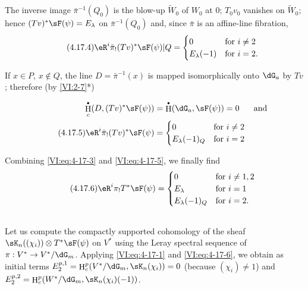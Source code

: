 \documentclass[oneside]{book}
\DeclareMathOperator{\h}{H}
\theoremstyle{sga-source}
\theoremstyle{sga-source-dash}
\theoremstyle{sga-source-dotdash}
\theoremstyle{sga-source-number-note-dash}
\theoremstyle{sga-source-note-number-dotdash}
\theoremstyle{sga-source-example-dotdash}
\theoremstyle{sga-source-inline-number}
\theoremstyle{sga-source-bare-number}
\theoremstyle{sga-source}
\let\oldbullet\bullet
\renewcommand{\bullet}{\textnormal{\tiny$\oldbullet$}}
\newcommand{\PrintPage}[1]{}\newcommand{\MathPage}[1]{}\newcommand{\PrintCite}[2]{#1}\newcommand{\var}[3]{#2}
\begin{document}
The inverse image $\bar\pi^{-1}(Q_0)$ is the blow-up $\widetilde W_0$ of 
$W_0$ at $0$; \var{$T_0 V_0$ vanishes}{$T_0 v_0$ vanishes}{S45-SOL-0849} on $\widetilde W_0$; hence 
$(T v)^\ast \sF(\psi)=E_\lambda$ \var{on $\pi^{-1}(Q_0)$}{on $\bar\pi^{-1}(Q_0)$}{S45-SOL-0850} and, since $\bar\pi$ is an 
affine-line fibration, 
\begin{equation*}\tag{4.17.4}\label{VI:eq:4-17-4}
  \eR^i \bar\pi_! (T v)^\ast \sF(\psi)|Q = 
    \begin{cases}
      0 & \text{for $i\ne 2$} \\
      E_\lambda(-1) & \text{for $i=2$.} 
    \end{cases} 
\end{equation*}

If $x\in P$, $x\notin Q$, the line \var{$D=\pi^{-1}(x)$}{$D=\bar\pi^{-1}(x)$}{S45-SOL-0851} is mapped 
isomorphically onto $\dG_a$ by $T v$; therefore (by 
\ref{VI:2-7}*) 
\PrintPage{206}
\begin{align} \notag 
  \h_c^\bullet(D,(T v)^\ast \sF(\psi)) &= \h^\bullet(\dG_a,\sF(\psi)) = 0 && \text{and} \\
  \tag{4.17.5}\label{VI:eq:4-17-5}
  \eR^i \bar\pi_! (T v)^\ast \sF(\psi) 
    &= \begin{cases} 
         0 & \text{for $i\ne 2$} \\
         E_\lambda(-1)_Q & \text{for $i=2$} 
       \end{cases} 
\end{align}

Combining \eqref{VI:eq:4-17-3} and \eqref{VI:eq:4-17-5}, we finally find 
\begin{equation*}\tag{4.17.6}\label{VI:eq:4-17-6}
  \eR^i \pi_! T^\ast\sF(\psi) = 
    \begin{cases}
      0 & \text{for $i\ne 1,2$} \\
      E_\lambda & \text{for $i=1$} \\
      E_\lambda(-1)_Q & \text{for $i=2$.} 
    \end{cases}
\end{equation*}





\subsection{}\label{VI:4-18}

Let us compute the compactly supported cohomology of the sheaf 
$\sK_n((\chi_i))\otimes T^\ast \sF(\psi)$ on $V^\ast$ using the 
Leray spectral sequence of $\pi:V^\ast\to V^\ast/\dG_m$. Applying 
\eqref{VI:eq:4-17-1} and \eqref{VI:eq:4-17-6}, we obtain as initial terms 
$E_2^{p,1} = \h_c^p(V^\ast/\dG_m,\sK_n(\chi_i)) = 0$ (because $(\chi_i)\ne 1$) 
and $E_2^{p,2} = \h_c^p(W^\ast/\dG_m,\sK_n(\chi_i)(-1))$. 
\end{document}
